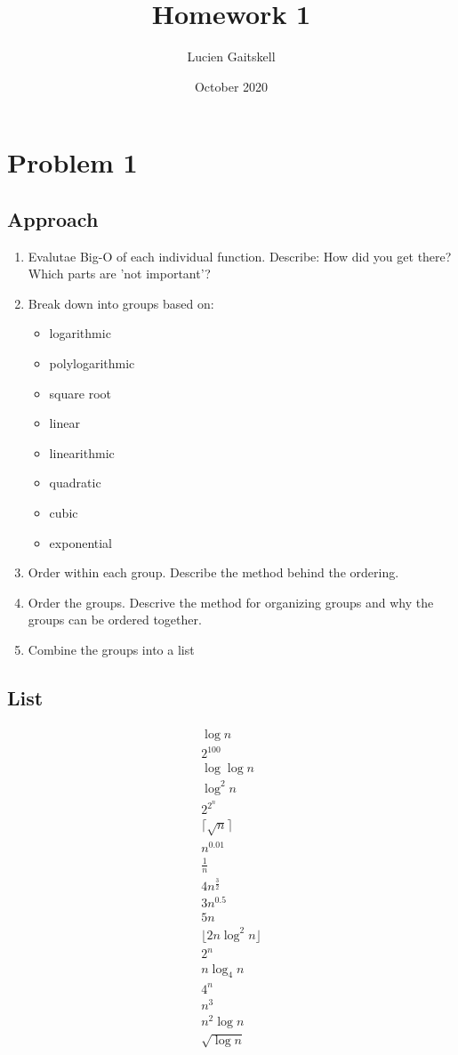 \documentclass{article}
\title{Homework 1}
\author{Lucien Gaitskell}
\date{October 2020}
\begin{document}
\maketitle

\section{Problem 1}
\subsection{Approach}

\begin{enumerate}
    \item Evalutae Big-O of each individual function. Describe: How did you get there? Which parts are 'not important'?
    \item Break down into groups based on:
    \begin{itemize}
        \item logarithmic
        \item polylogarithmic
        \item square root
        \item linear
        \item linearithmic
        \item quadratic
        \item cubic
        \item exponential
    \end{itemize}
    \item Order within each group. Describe the method behind the ordering.
    \item Order the groups. Descrive the method for organizing groups and why the groups can be ordered together.
    \item Combine the groups into a list
\end{enumerate}

\subsection{List}


\begin{align*}
    \log n \\
    2^{100} \\
    \log \log n \\
    \log^2 n \\
    2^{2^{n}} \\
    \lceil \sqrt{n} \rceil \\
    n^{0.01} \\
    \frac{1}{n} \\
    4n^{\frac{3}{2}} \\
    3n^{0.5} \\
    5n \\
    \lfloor 2n \log^2n \rfloor \\
    2^n \\
    n \log_4 n \\
    4^n \\
    n^3 \\
    n^2 \log n \\
    \sqrt{\log n}
\end{align*}
\end{document}
